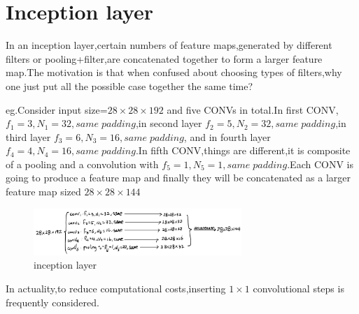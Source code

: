 \documentclass{article}
\begin{document}
\section{Inception layer}
In an inception layer,certain numbers of feature maps,generated by different filters or pooling+filter,are concatenated together to form a larger feature map.The motivation is that when confused about choosing types of filters,why one just put all the possible case together the same time?
\par eg.Consider input size=$28\times28\times192$ and five CONVs in total.In first CONV,$f_1=3,N_1=32,same\;padding$,in second layer $f_2=5,N_2=32,same \;padding$,in third layer $f_3=6,N_3=16,same \;padding$, and in fourth layer $f_4=4,N_4=16,same\; padding$.In fifth CONV,things are different,it is composite of a pooling and a convolution with $f_5=1,N_5=1,same \;padding$.Each CONV is going to produce a feature map and finally they will be concatenated as a larger feature map sized $28\times28\times144$
\begin{figure}[htbp]
	\centering
	\includegraphics[width=0.7\textwidth]{13.jpg}
	\caption{inception layer}
\end{figure}
\par In actuality,to reduce computational costs,inserting $1\times1$ convolutional steps is frequently considered.
\end{document}
